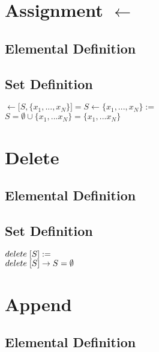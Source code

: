 \documentclass[11pt]{article}
\begin{document}
\section{Assignment $\leftarrow$}

\subsection{Elemental Definition}

\subsection{Set Definition}
\begin{center}
$\leftarrow \lbrack S,\{x_1,...,x_N\} \rbrack = S \leftarrow \{x_1,...,x_N\} :=$
\\ \vspace{2mm}
$S = \emptyset \cup \{x_1,...x_N\} =  \{x_1,...x_N\}$
\end{center}





\section{Delete}

\subsection{Elemental Definition}

\subsection{Set Definition}
\begin{center}
$delete \hspace{1mm} \lbrack S \rbrack :=$
\\ \vspace{2mm}
$delete \hspace{1mm} \lbrack S \rbrack \rightarrow S = \emptyset$
\end{center}





\section{Append}

\subsection{Elemental Definition}
\end{document}
